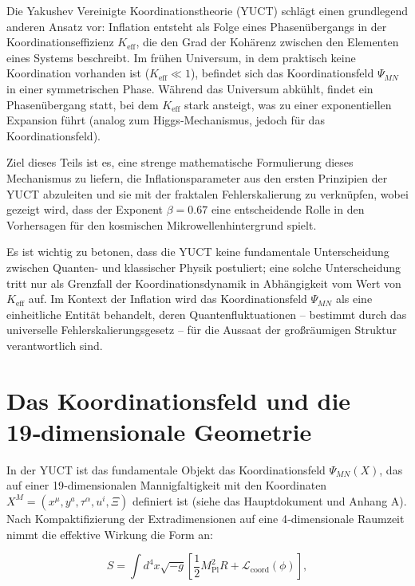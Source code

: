 \documentclass[11pt,a4paper]{article}
\newcommand{\Keff}{K_{\mathrm{eff}}}
\newcommand{\Mpl}{M_{\mathrm{Pl}}}
\begin{document}
	Die Yakushev Vereinigte Koordinationstheorie (YUCT) schlägt einen grundlegend anderen Ansatz vor: Inflation entsteht als Folge eines Phasenübergangs in der Koordinationseffizienz \(\Keff\), die den Grad der Kohärenz zwischen den Elementen eines Systems beschreibt. Im frühen Universum, in dem praktisch keine Koordination vorhanden ist (\(\Keff \ll 1\)), befindet sich das Koordinationsfeld \(\Psi_{MN}\) in einer symmetrischen Phase. Während das Universum abkühlt, findet ein Phasenübergang statt, bei dem \(\Keff\) stark ansteigt, was zu einer exponentiellen Expansion führt (analog zum Higgs‑Mechanismus, jedoch für das Koordinationsfeld).
	
	Ziel dieses Teils ist es, eine strenge mathematische Formulierung dieses Mechanismus zu liefern, die Inflationsparameter aus den ersten Prinzipien der YUCT abzuleiten und sie mit der fraktalen Fehlerskalierung zu verknüpfen, wobei gezeigt wird, dass der Exponent \(\beta = 0.67\) eine entscheidende Rolle in den Vorhersagen für den kosmischen Mikrowellenhintergrund spielt.
	
	Es ist wichtig zu betonen, dass die YUCT keine fundamentale Unterscheidung zwischen Quanten- und klassischer Physik postuliert; eine solche Unterscheidung tritt nur als Grenzfall der Koordinationsdynamik in Abhängigkeit vom Wert von \(K_{\mathrm{eff}}\) auf. Im Kontext der Inflation wird das Koordinationsfeld \(\Psi_{MN}\) als eine einheitliche Entität behandelt, deren Quantenfluktuationen – bestimmt durch das universelle Fehlerskalierungsgesetz – für die Aussaat der großräumigen Struktur verantwortlich sind.
	
	\section{Das Koordinationsfeld und die 19‑dimensionale Geometrie}
	\label{sec:field}
	
	In der YUCT ist das fundamentale Objekt das Koordinationsfeld \(\Psi_{MN}(X)\), das auf einer 19‑dimensionalen Mannigfaltigkeit mit den Koordinaten \(X^M = (x^\mu, y^a, \tau^\alpha, u^i, \Xi)\) definiert ist (siehe das Hauptdokument und Anhang A). Nach Kompaktifizierung der Extradimensionen auf eine 4‑dimensionale Raumzeit nimmt die effektive Wirkung die Form an:
	
	\begin{equation}
		S = \int d^4x \sqrt{-g} \left[ \frac{1}{2} \Mpl^2 R + \mathcal{L}_{\mathrm{coord}}(\phi) \right],
		\label{eq:action}
	\end{equation}
	
\end{document}
